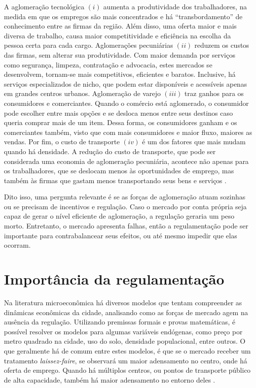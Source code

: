 A aglomeração tecnológica $(i)$ aumenta a produtividade dos trabalhadores, na medida em que os empregos são mais concentrados e há ``transbordamento'' de conhecimento entre as firmas da região. Além disso, uma oferta maior e mais diversa de trabalho, causa maior competitividade e eficiência na escolha da pessoa certa para cada cargo. Aglomerações pecuniárias $(ii)$ reduzem os custos das firmas, sem alterar sua produtividade. Com maior demanda por serviços como segurança, limpeza, contratação e advocacia, estes mercados se desenvolvem, tornam-se mais competitivos, eficientes e baratos. Inclusive, há serviços especializados de nicho, que podem estar disponíveis e acessíveis apenas em grandes centros urbanos. Aglomeração de varejo $(iii)$ traz ganhos para os consumidores e comerciantes. Quando o comércio está aglomerado, o consumidor pode escolher entre mais opções e se desloca menos entre seus destinos caso queria comprar mais de um item. Dessa forma, os consumidores ganham e os comerciantes também, visto que com mais consumidores e maior fluxo, maiores as vendas. Por fim, o custo de transporte $(iv)$ é um dos fatores que mais mudam quando há densidade. A redução do custo de transporte, que pode ser considerada uma economia de aglomeração pecuniária, acontece não apenas para os trabalhadores, que se deslocam menos às oportunidades de emprego, mas também às firmas que gastam menos transportando seus bens e serviços \cite{brueckner2011lectures}.

Dito isso, uma pergunta relevante é se as forças de aglomeração atuam sozinhas ou se precisam de incentivos e regulação. Caso o mercado por conta própria seja capaz de gerar o nível eficiente de aglomeração, a regulação geraria um peso morto. Entretanto, o mercado apresenta falhas, então a regulamentação pode ser importante para contrabalancear seus efeitos, ou até mesmo impedir que elas ocorram.

\section{Importância da regulamentação}
\label{sec:intro-regulacao}

Na literatura microeconômica há diversos modelos que tentam compreender as dinâmicas econômicas da cidade, analisando como as forças de mercado agem na ausência da regulação. Utilizando premissas formais e provas matemáticas, é possível resolver os modelos para algumas variáveis endógenas, como preço por metro quadrado na cidade, uso do solo, densidade populacional, entre outros. O que geralmente há de comum entre estes modelos, é que se o mercado receber um tratamento \textit{laissez-faire}, se observará um maior adensamento no centro, onde há oferta de emprego. Quando há múltiplos centros, ou pontos de transporte público de alta capacidade, também há maior adensamento no entorno deles \cite{papageorgiou2012essay, fujita1989urban,brueckner2011lectures}.

